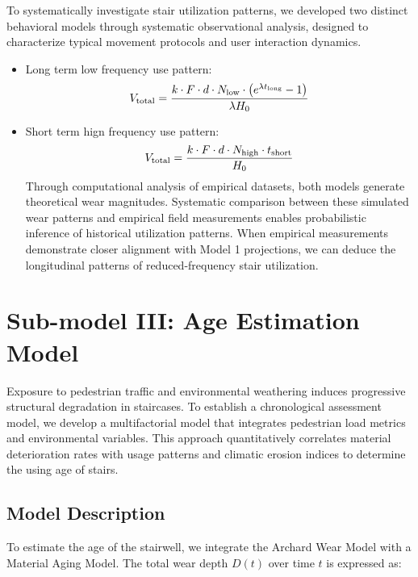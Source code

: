 \documentclass{mcmthesis}
\begin{document}
\hspace{3.5em}To systematically investigate stair utilization patterns, we developed two distinct behavioral models through systematic observational analysis, designed to characterize typical movement protocols and user interaction dynamics.

\begin{itemize}


\item  Long term low frequency use pattern:
\begin{equation}
\label{eq9}
\hfill
V_{\text{total}} = \frac{k \cdot F \cdot d \cdot N_{\text{low}} \cdot \left(e^{\lambda t_{\text{long}}} - 1\right)}{\lambda H_0}
\end{equation}

\item  Short term hign frequency use pattern:
\begin{equation}
\label{eq9}
\hfill
V_{\text{total}} = \frac{k \cdot F \cdot d \cdot N_{\text{high}} \cdot t_{\text{short}}}{H_0}
\end{equation}
\hspace{1.5em}Through computational analysis of empirical datasets, both models generate theoretical wear magnitudes. Systematic comparison between these simulated wear patterns and empirical field measurements enables probabilistic inference of historical utilization patterns. When empirical measurements demonstrate closer alignment with Model 1 projections, we can deduce the longitudinal patterns of reduced-frequency stair utilization.

\end{itemize}

\section{Sub-model III: Age Estimation Model}
\hspace{1.5em}Exposure to pedestrian traffic and environmental weathering induces progressive structural degradation in staircases. To establish a chronological assessment model, we develop a multifactorial model that integrates pedestrian load metrics and environmental variables. This approach quantitatively correlates material deterioration rates with usage patterns and climatic erosion indices to determine the using age of stairs.

\subsection{Model Description}
\hspace{1.5em}To estimate the age of the stairwell, we integrate the Archard Wear Model with a Material Aging Model. The total wear depth \( D(t) \) over time \( t \) is expressed as:
\end{document}
